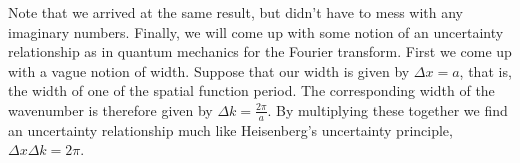 \documentclass[11pt]{amsart}
\begin{document}
Note that we arrived at the same result, but didn't have to mess with any imaginary numbers. Finally, we will come up with some notion of an uncertainty relationship as in quantum mechanics for the Fourier transform. First we come up with a vague notion of width. Suppose that our width is given by $\Delta x = a$, that is, the width of one of the spatial function period. The corresponding width of the wavenumber is therefore given by $\Delta k = \frac{2\pi}{a}$. By multiplying these together we find an uncertainty relationship much like Heisenberg's uncertainty principle, $\Delta x \Delta k = 2\pi$.
\end{document}
